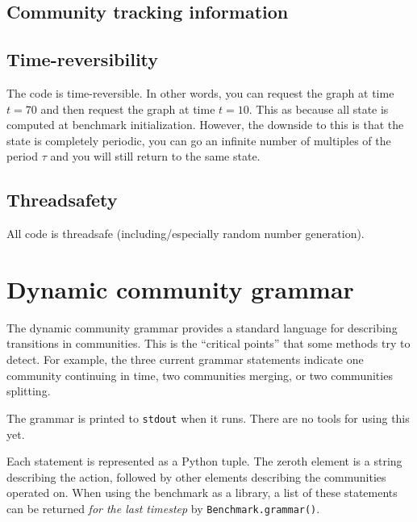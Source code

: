 \documentclass{article}
\begin{document}
\subsection{Community tracking information}

\subsection{Time-reversibility}
The code is time-reversible.  In other words, you can request the
graph at time $t=70$ and then request the graph at time $t=10$.  This
as because all state is computed at benchmark initialization.
However, the downside to this is that the state is completely
periodic, you can go an infinite number of multiples of the period
$\tau$ and you will still return to the same state.

\subsection{Threadsafety}
All code is threadsafe (including/especially random number generation).


\section{Dynamic community grammar}
\label{sec:dyn-grammar}

The dynamic community grammar provides a standard language for
describing transitions in communities.  This is the ``critical
points'' that some methods try to detect.  For example, the three
current grammar statements indicate one community continuing in time,
two communities merging, or two communities splitting.

The grammar is printed to \texttt{stdout} when it runs.  There are no
tools for using this yet.

Each statement is represented as a Python tuple.  The zeroth element
is a string describing the action, followed by other elements
describing the communities operated on.  When using the benchmark as a
library, a list of these statements can be returned \textit{for the
  last timestep} by \texttt{Benchmark.grammar()}.
\end{document}

